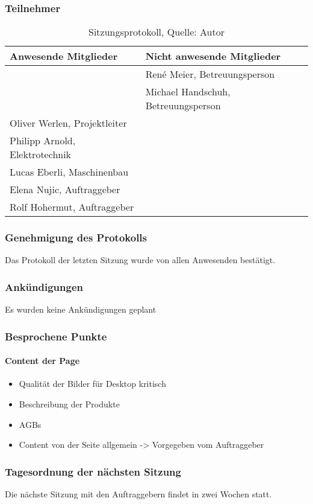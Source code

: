 \subsubsection{Teilnehmer}
\begin{table}[H]
	\setlength\extrarowheight{2pt} %
	\begin{tabularx}{\textwidth}{|X|X|}
		\hline
		\textbf{Anwesende Mitglieder} &  \textbf{Nicht anwesende Mitglieder} \\
		\hline
		& René Meier, Betreuungsperson  \\
		& Michael Handschuh, Betreuungsperson   \\
		Oliver Werlen, Projektleiter &  \\
		Philipp Arnold, Elektrotechnik & \\
		Lucas Eberli, Maschinenbau & \\
		Elena Nujic, Auftraggeber & \\
		Rolf Hohermut, Auftraggeber & \\
		\hline
	\end{tabularx}
	\caption{ \label{tbl: Teilnehmerliste vom 01.04.2021}Sitzungsprotokoll, Quelle: Autor}
\end{table}
\subsubsection{Genehmigung des Protokolls}
Das Protokoll der letzten Sitzung wurde von allen Anwesenden bestätigt.
\subsubsection{Ankündigungen}
Es wurden keine Ankündigungen geplant
\subsubsection{Besprochene Punkte}
\paragraph{Content der Page}
\begin{itemize}
	\item Qualität der Bilder für Desktop kritisch
	\item Beschreibung der Produkte
	\item AGBs
	\item Content von der Seite allgemein -> Vorgegeben vom Auftraggeber
\end{itemize}
\subsubsection{Tagesordnung der nächsten Sitzung}
Die nächste Sitzung mit den Auftraggebern findet in zwei Wochen statt. 
